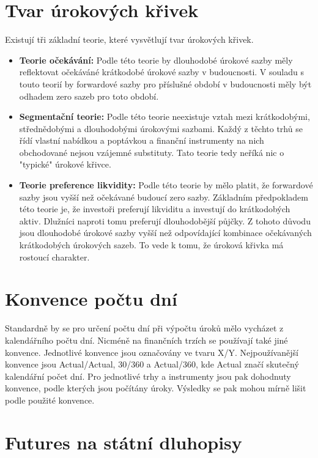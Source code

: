 \documentclass[a4paper]{book}
\begin{document}
\section {Tvar úrokových křivek}

Existují tři základní teorie, které vysvětlují tvar úrokových křivek.
\begin{itemize}
  \item \textbf{Teorie očekávání:} Podle této teorie by dlouhodobé úrokové sazby měly reflektovat očekáváné krátkodobé úrokové sazby v budoucnosti. V souladu s touto teorií by forwardové sazby pro příslušné období v budoucnosti měly být odhadem zero sazeb pro toto období.
  \item \textbf{Segmentační teorie:} Podle této teorie neexistuje vztah mezi krátkodobými, střednědobými a dlouhodobými úrokovými sazbami. Každý z těchto trhů se řídí vlastní nabídkou a poptávkou a finanční instrumenty na nich obchodované nejsou vzájemné substituty. Tato teorie tedy neříká nic o "typické" úrokové křivce.
  \item \textbf{Teorie preference likvidity:} Podle této teorie by mělo platit, že forwardové sazby jsou vyšší než očekávané budoucí zero sazby. Základním předpokladem této teorie je, že investoři preferují likviditu a investují do krátkodobých aktiv. Dlužníci naproti tomu preferují dlouhodobější půjčky. Z tohoto důvodu jsou dlouhodobé úrokové sazby vyšší než odpovídající kombinace očekávaných krátkodobých úrokových sazeb. To vede k tomu, že úroková křivka má rostoucí charakter.
\end{itemize}

\section{Konvence počtu dní}

Standardně by se pro určení počtu dní při výpočtu úroků mělo vycházet z kalendářního počtu dní. Nicméně na finančních trzích se používají také jiné konvence. Jednotlivé konvence jsou označovány ve tvaru X/Y. Nejpoužívanější konvence jsou Actual/Actual, 30/360 a Actual/360, kde Actual značí skutečný kalendářní počet dní. Pro jednotlivé trhy a instrumenty jsou pak dohodnuty konvence, podle kterých jsou počítány úroky. Výsledky se pak mohou mírně lišit podle použité konvence.

\section{Futures na státní dluhopisy}
\end{document}
